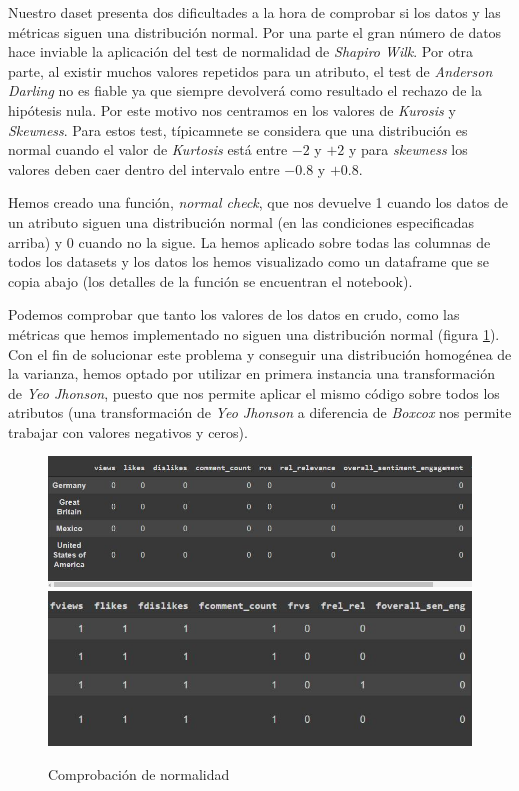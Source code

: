 \documentclass[a4paper,12pt]{article}
\begin{document}
Nuestro daset presenta dos dificultades a la hora de comprobar si los datos y las m\'etricas siguen una distribuci\'on normal. Por una parte el gran n\'umero de datos hace inviable la aplicaci\'on del test de normalidad de {\itshape  Shapiro Wilk}. Por otra parte, al existir muchos valores repetidos para un atributo, el test de {\itshape Anderson Darling} no es fiable ya que siempre devolver\'a como resultado el rechazo de la hip\'otesis nula. Por este motivo nos centramos en los valores de {\itshape Kurosis} y {\itshape Skewness}. Para estos test, t\'ipicamnete se considera que una distribuci\'on es normal cuando el valor de {\itshape Kurtosis} est\'a entre $-2$ y $+2$ y para {\itshape skewness} los valores deben caer dentro del intervalo entre $-0.8$ y $+0.8$.

Hemos creado una funci\'on, {\itshape normal check}, que nos devuelve 1 cuando los datos de un atributo siguen una distribuci\'on normal (en las condiciones especificadas arriba) y 0 cuando no la sigue. La hemos aplicado sobre todas las columnas de todos los datasets y los datos los hemos visualizado como un dataframe que se copia abajo (los detalles de la funci\'on se encuentran el notebook).

Podemos comprobar que tanto los valores de los datos en crudo, como las m\'etricas que hemos implementado no siguen una distribuci\'on normal (figura \ref{fig:norm_1}). Con el fin de solucionar este problema y conseguir una distribuci\'on homog\'enea de la varianza, hemos optado por utilizar en primera instancia una transformaci\'on de {\itshape Yeo Jhonson}, puesto que nos permite aplicar el mismo c\'odigo sobre todos los atributos (una transformaci\'on de {\itshape Yeo Jhonson} a diferencia de {\itshape Boxcox} nos permite trabajar con valores negativos y ceros).




\begin{figure}
\centering
\includegraphics[width=12cm]{dataframe_1.JPG}
\includegraphics[width=12cm]{dataframe_2.JPG}
\caption{Comprobaci\'on de normalidad}
\label{fig:norm_1}
\end{figure}
 
\end{document}
